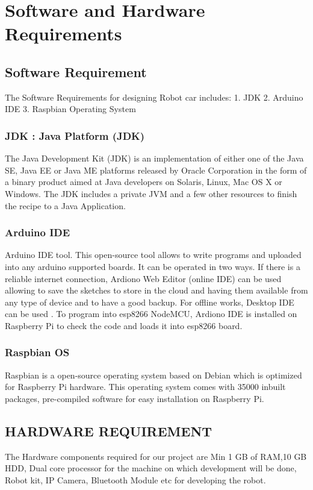 \documentclass[sigconf]{acmart}
\begin{document}
\section{Software and Hardware Requirements}

\subsection{Software Requirement}
The Software Requirements for designing Robot car includes:
1. JDK
2. Arduino IDE
3. Raspbian Operating System

\subsubsection{JDK : Java Platform (JDK)}
The Java Development Kit (JDK) is an implementation
of either one of the Java SE, Java EE or Java ME platforms released by Oracle 
Corporation in the form of a binary product aimed at Java developers on Solaris, 
Linux, Mac OS X or Windows. The JDK includes a private JVM and a few other 
resources to finish the recipe to a Java Application.

\subsubsection{Arduino IDE}
Arduino IDE tool. This open-source tool allows to write programs and uploaded 
into any arduino supported boards. It can be operated in two ways. If there 
is a reliable internet connection, Ardiono Web Editor (online IDE) can be 
used allowing to save the sketches to store in the cloud and having them 
available from any type of device and to have a good backup. For offline 
works, Desktop IDE can be used \cite{arduino2015}. To program into esp8266 
NodeMCU, Ardiono IDE is installed on Raspberry Pi to check the code and loads 
it into esp8266 board.

\subsubsection{Raspbian OS}
Raspbian is a open-source operating system based on Debian which is optimized 
for Raspberry Pi hardware. This operating system comes with 35000 inbuilt packages, 
pre-compiled software for easy installation on Raspberry Pi.

\subsection{HARDWARE REQUIREMENT}
The Hardware components required for our project are Min 1 GB of RAM,10 GB HDD, 
Dual core processor for the machine on which development will be done, Robot kit, 
IP Camera, Bluetooth Module etc for developing the robot.
\end{document}
